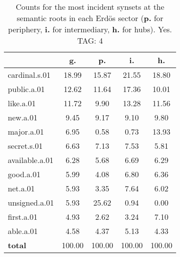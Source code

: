 \begin{table}[h!]
\begin{center}
\begin{tabular}{| l | c | c | c | c |}\hline
 & g. & p. & i. & h. \\\hline
cardinal.s.01 & 18.99  & 15.87  & 21.55  & 18.80 \\\hline
public.a.01 & 12.62  & 11.64  & 17.36  & 10.01 \\\hline
like.a.01 & 11.72  & 9.90  & 13.28  & 11.56 \\\hline
new.a.01 & 9.45  & 9.17  & 9.10  & 9.80 \\\hline
major.a.01 & 6.95  & 0.58  & 0.73  & 13.93 \\\hline
secret.s.01 & 6.63  & 7.13  & 7.53  & 5.81 \\\hline
available.a.01 & 6.28  & 5.68  & 6.69  & 6.29 \\\hline
good.a.01 & 5.99  & 4.08  & 6.80  & 6.36 \\\hline
net.a.01 & 5.93  & 3.35  & 7.64  & 6.02 \\\hline
unsigned.a.01 & 5.93  & 25.62  & 0.94  & 0.00 \\\hline
first.a.01 & 4.93  & 2.62  & 3.24  & 7.10 \\\hline
able.a.01 & 4.58  & 4.37  & 5.13  & 4.33 \\\hline
{{\bf total}} & 100.00  & 100.00  & 100.00  & 100.00 \\\hline
\end{tabular}
\caption{Counts for the most incident synsets at the semantic roots in each Erd\"os sector ({\bf p.} for periphery, {\bf i.} for intermediary, {\bf h.} for hubs). Yes. TAG: 4}
\end{center}
\end{table}